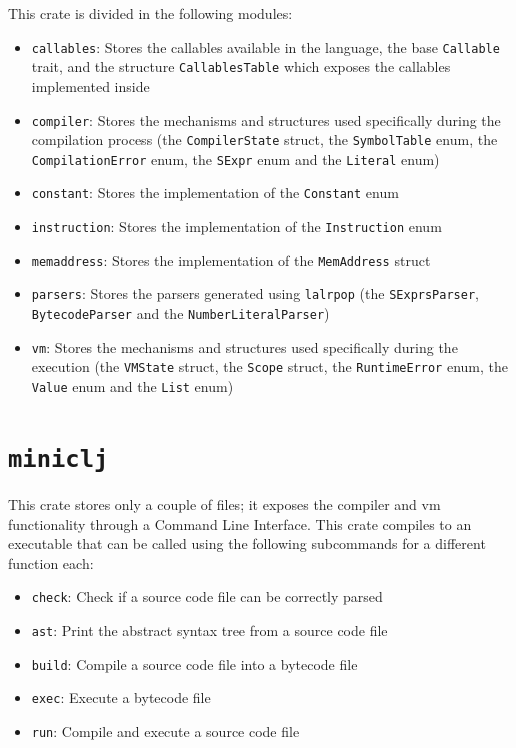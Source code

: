 \documentclass[11pt]{scrreprt}
\begin{document}
This crate is divided in the following modules:
\begin{itemize}
  \item \texttt{callables}: Stores the callables available in the language, the base \texttt{Callable} trait, and the structure \texttt{CallablesTable} which exposes the callables implemented inside
  \item \texttt{compiler}: Stores the mechanisms and structures used specifically during the compilation process (the \texttt{CompilerState} struct, the \texttt{SymbolTable} enum, the \texttt{CompilationError} enum, the \texttt{SExpr} enum and the \texttt{Literal} enum)
  \item \texttt{constant}: Stores the implementation of the \texttt{Constant} enum
  \item \texttt{instruction}: Stores the implementation of the \texttt{Instruction} enum
  \item \texttt{memaddress}: Stores the implementation of the \texttt{MemAddress} struct
  \item \texttt{parsers}: Stores the parsers generated using \texttt{lalrpop} (the \texttt{SExprsParser}, \texttt{BytecodeParser} and the \texttt{NumberLiteralParser})
  \item \texttt{vm}: Stores the mechanisms and structures used specifically during the execution (the \texttt{VMState} struct, the \texttt{Scope} struct, the \texttt{RuntimeError} enum, the \texttt{Value} enum and the \texttt{List} enum)
\end{itemize}

\section{\texttt{miniclj}}
This crate stores only a couple of files; it exposes the compiler and vm functionality through a Command Line Interface. This crate compiles to an executable that can be called using the following subcommands for a different function each:
\begin{itemize}
  \item \texttt{check}: Check if a source code file can be correctly parsed
  \item \texttt{ast}: Print the abstract syntax tree from a source code file
  \item \texttt{build}: Compile a source code file into a bytecode file
  \item \texttt{exec}: Execute a bytecode file
  \item \texttt{run}: Compile and execute a source code file
\end{itemize}
\end{document}
